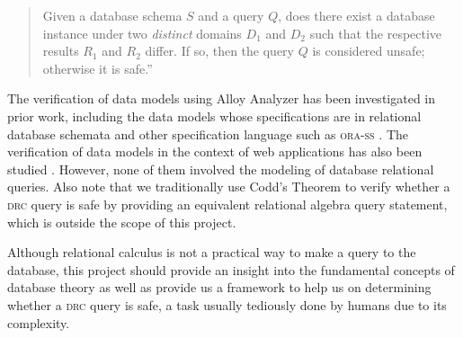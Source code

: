 \begin{quote}
    Given a database schema $S$ and a query $Q$, does there exist a database instance under two \emph{distinct} domains $D_1$ and $D_2$ such that the respective results $R_1$ and $R_2$ differ. If so, then the query $Q$ is considered unsafe; otherwise it is safe.''
\end{quote}

The verification of data models using Alloy Analyzer has been investigated in prior work, including the data models whose specifications are in relational database schemata \cite{Cunha:2009:MAS:1685167.1685438} and other specification language such as \textsc{ora-ss} \cite{Wang:2006:VOD:1129030.1129454}.
The verification of data models in the context of web applications has also been studied \cite{Nijjar:2011:BVR:2001420.2001429,Nijjar:2015:DMP:2820114.2699691}. However, none of them involved the modeling of database relational queries.
Also note that we traditionally use Codd's Theorem \cite{codd1972relational} to verify whether a \textsc{drc} query is safe by providing an equivalent relational algebra query statement, which is outside the scope of this project.

Although relational calculus is not a practical way to make a query to the database, this project should provide an insight into the fundamental concepts of database theory as well as provide us a framework to help us on determining whether a \textsc{drc} query is safe, a task usually tediously done by humans due to its complexity.
